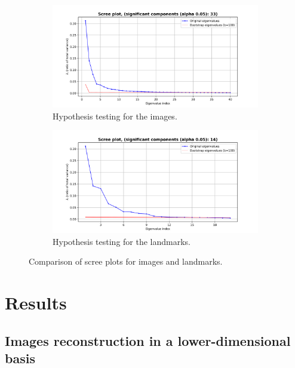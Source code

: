 \documentclass{article}
\begin{document}
\begin{figure}[H]
    \centering

    \begin{subfigure}{0.7\textwidth}
        \centering
        \includegraphics[width=\linewidth]{images/images_scree_plot.png}
        \caption{Hypothesis testing for the images.}
        \label{fig:scree_plot_images}
    \end{subfigure}
    \begin{subfigure}{0.7\textwidth}
        \centering
        \includegraphics[width=\linewidth]{images/landmarks_scree_plot.png}
        \caption{Hypothesis testing for the landmarks.}
        \label{fig:scree_plot_landmarks}
    \end{subfigure}

    \caption{Comparison of scree plots for images and landmarks.}
    \label{fig:scree_plots}
\end{figure}



\section{Results}

\subsection{Images reconstruction in a lower-dimensional basis}
\end{document}
